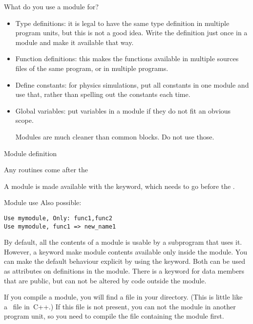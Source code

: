 What do you use a module for?
\begin{itemize}
\item Type definitions: it is legal to have the same type definition
  in multiple program units, but this is not a good idea. 
  Write the definition just once in a module and make it available
  that way.
\item Function definitions: this makes the functions available in multiple
  sources files of the same program, or in multiple programs.
\item Define constants: for physics simulations, put all constants in
  one module and use that, rather than spelling out the constants each
  time.
\item Global variables: put variables in a module if they do not fit
  an obvious scope.
  \begin{f77note}
  Modules are much cleaner than common blocks. Do not use those.
  \end{f77note}
\end{itemize}
%
\begin{block}{Module definition}
  \label{sl:modulef}
\end{block}


Any routines come after the 

A module is made available with the  keyword, which
needs to go before the .
%
\begin{block}{Module use}
  \label{sl:moduleuse}
  Also possible:
\begin{verbatim}
Use mymodule, Only: func1,func2
Use mymodule, func1 => new_name1
\end{verbatim}
\end{block}

By default, all the contents of a module is usable by a subprogram
that uses it. However, a keyword  make module
contents available only inside the module.
You can make the default behaviour explicit by using the
 keyword. Both  can be used as
attributes on definitions in the module.
There is a keyword  for data members that
are public, but can not be altered by code outside the module.

If you compile a module, you will find a  file in your
directory. (This is little like a~ file in~C++.)
If this file is not present, you can not  the module in another
program unit, so you need to compile the file containing the module
first.

